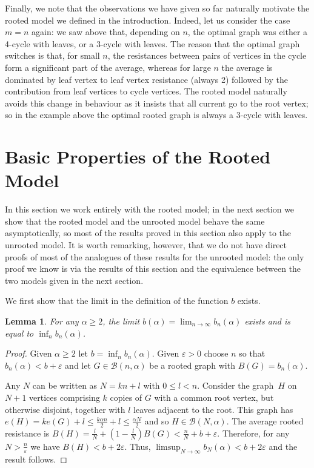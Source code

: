 \documentclass[11pt]{article}
\newtheorem{lemma}[theorem]{Lemma}
\theoremstyle{remark}
\def\a{\alpha}
\def\e{\varepsilon}
\def\cB{\mathcal{B}}
\begin{document}
Finally, we note that the observations we have given so far naturally
motivate the rooted model we defined in the introduction.  Indeed, let
us consider the case $m=n$ again: we saw above that, depending on $n$,
the optimal graph was either a 4-cycle with leaves, or a 3-cycle with
leaves. The reason that the optimal graph switches is that, for small
$n$, the resistances between pairs of vertices in the cycle form a
significant part of the average, whereas for large $n$ the average is
dominated by leaf vertex to leaf vertex resistance (always 2) followed
by the contribution from leaf vertices to cycle vertices.  The rooted
model naturally avoids this change in behaviour as it insists that all
current go to the root vertex; so in the example above the optimal
rooted graph is always a 3-cycle with leaves.



\section{Basic Properties of the Rooted Model}\label{s:basic}
In this section we work entirely with the rooted model; in the next
section we show that the rooted model and the unrooted model behave
the same asymptotically, so most of the results proved in this section
also apply to the unrooted model. It is worth remarking, however, that
we do not have direct proofs of most of the analogues of these results
for the unrooted model: the only proof we know is via the results of
this section and the equivalence between the two models given in the
next section. 

We first show that the limit in the definition of the function $b$
exists.

\begin{lemma}\label{limit:lem}
For any $\alpha\ge 2$, the limit $b(\a)=\lim_{n\to\infty}b_n(\a)$ exists and is equal to $\inf_n b_n(\a)$.
\end{lemma}
\begin{proof}
  Given $\a\geq2$ let $b=\inf_nb_n(\a)$. Given $\e>0$ choose $n$ so
  that $b_n(\a)<b+\e$ and let $G\in\cB(n,\a)$ be a rooted
  graph with $B(G)=b_n(\a)$. 

  Any $N$ can be written as $N=kn+l$ with $0\leq l<n$. Consider the
  graph~$H$ on~$N+1$ vertices comprising $k$ copies of $G$ with a
  common root vertex, but otherwise disjoint, together with $l$ leaves
  adjacent to the root. This graph has
  $e(H)=ke(G)+l\leq\frac{k\a n}{2}+l\leq\frac{\a N}{2}$ and so
  $H\in\cB(N,\a)$.  The average rooted resistance is
  $B(H)=\frac{l}{N}+\left(1-\frac{l}{N}\right)B(G)<\frac{n}{N}+b+\e$. Therefore,
  for any $N>\frac{n}{\e}$ we have $B(H)<b+2\e$. Thus,
  $\limsup_{N\to\infty} b_N(\a)<b+2\e$ and the result follows.
\end{proof}
\end{document}

